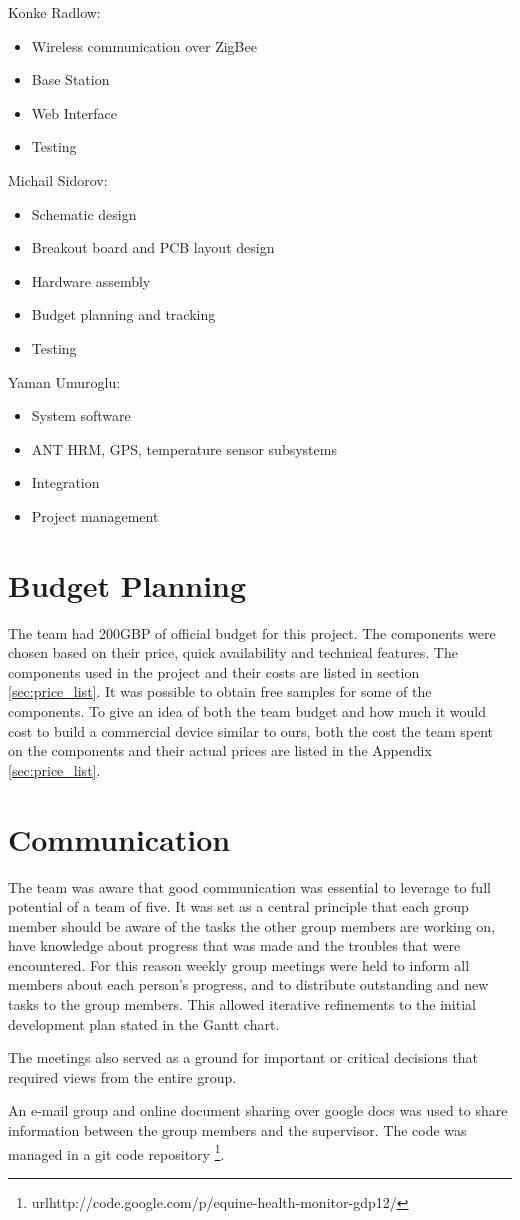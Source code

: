 Konke Radlow:
\begin{itemize}
\item Wireless communication over ZigBee
\item Base Station
\item Web Interface
\item Testing
\end{itemize}

Michail Sidorov:
\begin{itemize}
\item Schematic design
\item Breakout board and PCB layout design
\item Hardware assembly
\item Budget planning and tracking
\item Testing
\end{itemize}

Yaman Umuroglu: 
\begin{itemize}
\item System software
\item ANT HRM, GPS, temperature sensor subsystems
\item Integration
\item Project management 
\end{itemize}


\section{Budget Planning}
The team had 200GBP of official budget for this project. The components were chosen based on their price, quick availability and technical features. The components used in the project and their costs are listed in section \ref{sec:price_list}. It was possible to obtain free samples for some of the components. To give an idea of both the team budget and how much it would cost to build a commercial device similar to ours, both the cost the team spent on the components and their actual prices are listed in the Appendix \ref{sec:price_list}.


\section{Communication}
The team was aware that good communication was essential to leverage to full potential of a team of five. It was set as a central principle that each group member should be aware of the tasks the other group members are working on, have knowledge about progress that was made and the troubles that were encountered. For this reason weekly group meetings were held to inform all members about each person's progress, and to distribute outstanding and new tasks to the group members. This allowed iterative refinements to the initial development plan stated in the Gantt chart.

The meetings also served as a ground for important or critical decisions that required views from the entire group.

An e-mail group and online document sharing over google docs was used to share information between the group members and the supervisor. The code was managed in a git code repository \footnote{url{http://code.google.com/p/equine-health-monitor-gdp12/}}.